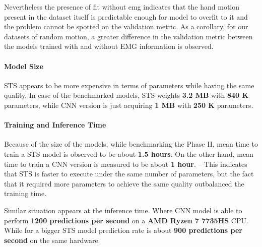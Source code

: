 Nevertheless the presence of fit without emg indicates that the hand motion present in the dataset itself is predictable enough for model to overfit to it and the problem cannot be spotted on the validation metric. As a corollary, for our datasets of random motion, a greater difference in the validation metric between the models trained with and without EMG information is observed.

\paragraph{Model Size}
STS appears to be more expensive in terms of parameters while having the same quality. In case of the benchmarked models, STS weights \textbf{3.2 MB} with \textbf{840 K} parameters, while CNN version is just acquiring \textbf{1 MB} with \textbf{250 K} parameters.

\paragraph{Training and Inference Time}
Because of the size of the models, while benchmarking the Phase II, mean time to train a STS model is observed to be about \textbf{1.5 hours}. On the other hand, mean time to train a CNN version is measured to be about \textbf{1 hour}. -- This indicates that STS is faster to execute under the same number of parameters, but the fact that it required more parameters to achieve the same quality outbalanced the training time.

Similar situation appears at the inference time. Where CNN model is able to perform \textbf{1200 predictions per second} on a \textbf{AMD Ryzen 7 7735HS} CPU. While for a bigger STS model prediction rate is about \textbf{900 predictions per second} on the same hardware.